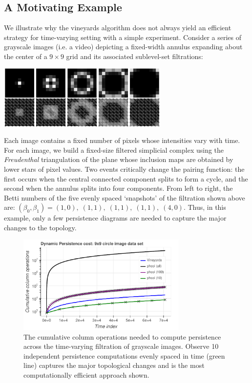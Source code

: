 \documentclass[sn-mathphys]{sn-jnl}
\begin{document}
 \subsection{A Motivating Example}\label{sec:motivation} 
We illustrate why the vineyards algorithm does not always yield an efficient strategy for time-varying setting with a simple experiment. 
Consider a series of grayscale images (i.e. a video) depicting a fixed-width annulus expanding about the center of a $9 \times 9$ grid and its associated sublevel-set filtrations:   
\begin{center}
	\vspace{1em}
	\includegraphics[height=1.25in]{circle_complex.png}
\end{center}
Each image contains a fixed number of pixels whose intensities vary with time. For each image, we build a fixed-size filtered simplicial complex using the \emph{Freudenthal} triangulation of the plane whose inclusion maps are obtained by lower stars of pixel values.   
Two events critically change the pairing function: the first occurs when the central connected component splits to form a cycle, and the second  when the annulus  splits into four components. 
From left to right, the Betti numbers of the five evenly spaced `snapshots' of the filtration shown above are: $(\beta_0,\beta_1)  = (1,0), \; (1,1),  \; (1,1), \; (1,1), \; (4,0)$.
Thus, in this example, only a few persistence diagrams are needed to capture the major changes to the topology. 
\begin{figure}[t]
 	\centering
 	\includegraphics[width=0.75\textwidth]{circle_vineyards_vector.pdf}
 	\caption{The cumulative column operations needed to compute persistence across the time-varying filtration of grayscale images. Observe 10 independent persistence computations evenly spaced in time (green line) captures the major topological changes and is the most computationally efficient approach shown.}
 	\label{fig:vineyards}
 \end{figure}
  
\end{document}

